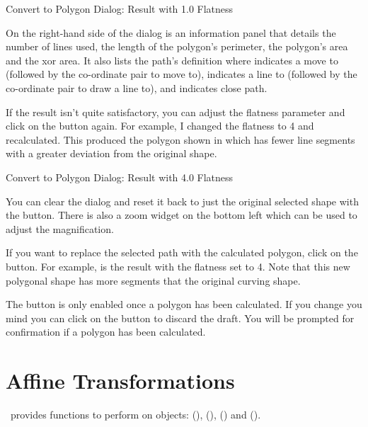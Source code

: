 {}
{Convert to Polygon Dialog: Result with 1.0 Flatness}

On the right-hand side of the  dialog is an
information panel that details the number of lines used, the length
of the polygon's perimeter, the polygon's area and the \gls{xor} area.
It also lists the path's definition where  indicates a move to
(followed by the co-ordinate pair to move to),  indicates a line to
(followed by the co-ordinate pair to draw a line to), and 
indicates close path.

If the result isn't quite satisfactory, you can adjust the flatness
parameter and click on the  button again.
For example, I changed the flatness to 4 and recalculated. This
produced the polygon shown in  which
has fewer line segments with a greater deviation from the original
shape.

{}
{Convert to Polygon Dialog: Result with 4.0 Flatness}


You can clear the dialog and reset it back to just the original
selected shape with the  button.
There is also a zoom widget on the bottom left which can be used to
adjust the magnification.

If you want to replace the selected path with the
calculated polygon, click on the  button.  For example,
 is the result with the flatness set
to 4. Note that this new polygonal shape has more segments that the 
original curving shape.

\begin{information}
The  button is only enabled once a polygon has been
calculated. If you change you mind you can click on the 
button to discard the draft. You will be prompted for confirmation
if a polygon has been calculated.
\end{information}


\section{Affine Transformations}\label{sec:affinetrans}

\FlowframTk\ provides functions to perform 
 on \glspl{object}:
 (), 
 (), 
 () and 
 ().


